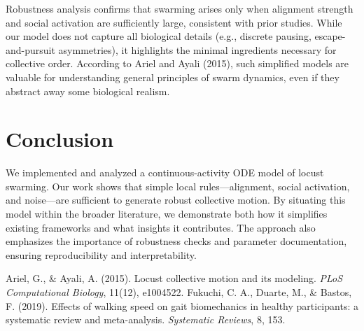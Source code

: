 \documentclass[11pt,a4paper]{article}
\begin{document}
Robustness analysis confirms that swarming arises only when alignment strength and social activation are sufficiently large, consistent with prior studies. While our model does not capture all biological details (e.g., discrete pausing, escape-and-pursuit asymmetries), it highlights the minimal ingredients necessary for collective order. According to Ariel and Ayali (2015), such simplified models are valuable for understanding general principles of swarm dynamics, even if they abstract away some biological realism.

\section{Conclusion}

We implemented and analyzed a continuous-activity ODE model of locust swarming. Our work shows that simple local rules—alignment, social activation, and noise—are sufficient to generate robust collective motion. By situating this model within the broader literature, we demonstrate both how it simplifies existing frameworks and what insights it contributes. The approach also emphasizes the importance of robustness checks and parameter documentation, ensuring reproducibility and interpretability.

\begin{thebibliography}{9}
Ariel, G., \& Ayali, A. (2015). Locust collective motion and its modeling. \emph{PLoS Computational Biology}, 11(12), e1004522.
Fukuchi, C. A., Duarte, M., \& Bastos, F. (2019). Effects of walking speed on gait biomechanics in healthy participants: a systematic review and meta-analysis. \emph{Systematic Reviews}, 8, 153.
\end{thebibliography}
\end{document}
